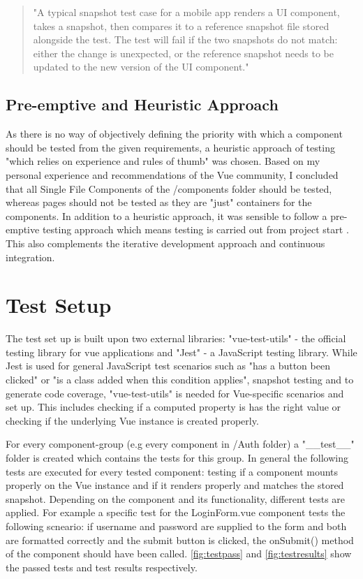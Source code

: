 \begin{quotation}
"A typical snapshot test case for a mobile app renders a UI component, takes a snapshot, then compares it to a reference snapshot file stored alongside the test. The test will fail if the two snapshots do not match: either the change is unexpected, or the reference snapshot needs to be updated to the new version of the UI component."
\end{quotation}

\subsection{Pre-emptive and Heuristic Approach} \label{preheur}
As there is no way of objectively defining the priority with which a component should be tested from the given requirements, a heuristic approach of testing "which relies on experience and rules of thumb" \cite{spillner2014software} was chosen. Based on my personal experience and recommendations of the Vue community, I concluded that all Single File Components of the /components folder should be tested, whereas pages should not be tested as they are "just" containers for the components. In addition to a heuristic approach, it was sensible to follow a pre-emptive testing approach which means testing is carried out from project start \cite{spillner2014software}. This also complements the iterative development approach and continuous integration. 

\section{Test Setup}
The test set up is built upon two external libraries: "vue-test-utils" - the official testing library for vue applications and "Jest" - a JavaScript testing library. While Jest is used for general JavaScript test scenarios such as "has a button been clicked" or "is a class added when this condition applies", snapshot testing and to generate code coverage, "vue-test-utils" is needed for Vue-specific scenarios and set up. This includes checking if a computed property is has the right value or checking if the underlying Vue instance is created properly.

For every component-group (e.g every component in /Auth folder) a "\_\_test\_\_" folder is created which contains the tests for this group. In general the following tests are executed for every tested component: testing if a component mounts properly on the Vue instance and if it renders properly and matches the stored snapshot. Depending on the component and its functionality, different tests are applied. For example a specific test for the LoginForm.vue component tests the following scneario: if username and password are supplied to the form and both are formatted correctly and the submit button is clicked, the onSubmit() method of the component should have been called. \autoref{fig:testpass} and \autoref{fig:testresults} show the passed tests and test results respectively.

